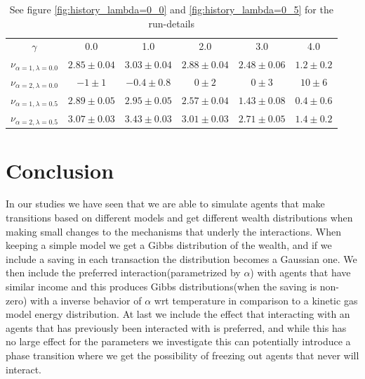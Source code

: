 \documentclass[a4paper,11pt]{article}
\begin{document}
{\begin{table}[h]
\caption{See figure \ref{fig:history_lambda=0_0} and \ref{fig:history_lambda=0_5} for the run-details}
\begin{center}
\begin{tabular}{c|c|c|c|c|c}
$\gamma$ & 0.0 & 1.0 & 2.0 & 3.0 & 4.0  \\
$\nu_{\alpha=1, \lambda=0.0}$ & $2.85\pm 0.04$ & $3.03\pm 0.04$ & $2.88\pm 0.04$ & $2.48\pm 0.06$ & $1.2\pm0.2$\\
$\nu_{\alpha=2, \lambda=0.0}$ & $-1 \pm 1$ & $-0.4\pm 0.8$ & $0\pm 2$ & $0\pm 3$ & $10\pm 6$ \\
$\nu_{\alpha=1, \lambda=0.5}$ & $2.89\pm 0.05$ & $2.95\pm 0.05$ & $2.57\pm 0.04$ & $1.43\pm 0.08$ &$0.4\pm0.6$  \\
$\nu_{\alpha=2, \lambda=0.5}$ & $3.07\pm 0.03$ & $3.43\pm 0.03$ & $3.01\pm 0.03$ & $2.71\pm 0.05$ & $1.4\pm 0.2$
\end{tabular}
\end{center}
\label{tab:hist}
\end{table}%




\section*{Conclusion}
In our studies we have seen that we are able to simulate agents that make transitions based on different models and get different wealth distributions when making small changes to the mechanisms that underly the interactions. When keeping a simple model we get a Gibbs distribution of the wealth, and if we include a saving in each transaction the distribution becomes a Gaussian one. We then include the preferred interaction(parametrized by $\alpha$) with agents that have similar income and this produces Gibbs distributions(when the saving is non-zero) with a inverse behavior of $\alpha$ wrt temperature in comparison to a kinetic gas model energy distribution. At last we include the effect that interacting with an agents that has previously been interacted with is preferred, and while this has no large effect for the parameters we investigate this can potentially introduce a phase transition where we get the possibility of freezing out agents that never will interact. \\

}
\end{document}
